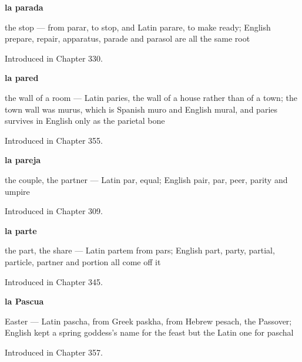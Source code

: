 \noindent\begin{minipage}[t]{\linewidth}
\raggedright
\textbf{la parada}\par
\small the stop — from parar, to stop, and Latin parare, to make ready; English prepare, repair, apparatus, parade and parasol are all the same root\par
\footnotesize Introduced in Chapter 330.
\end{minipage}\par\medskip

\noindent\begin{minipage}[t]{\linewidth}
\raggedright
\textbf{la pared}\par
\small the wall of a room — Latin paries, the wall of a house rather than of a town; the town wall was murus, which is Spanish muro and English mural, and paries survives in English only as the parietal bone\par
\footnotesize Introduced in Chapter 355.
\end{minipage}\par\medskip

\noindent\begin{minipage}[t]{\linewidth}
\raggedright
\textbf{la pareja}\par
\small the couple, the partner --- Latin par, equal; English pair, par, peer, parity and umpire\par
\footnotesize Introduced in Chapter 309.
\end{minipage}\par\medskip

\noindent\begin{minipage}[t]{\linewidth}
\raggedright
\textbf{la parte}\par
\small the part, the share — Latin partem from pars; English part, party, partial, particle, partner and portion all come off it\par
\footnotesize Introduced in Chapter 345.
\end{minipage}\par\medskip

\noindent\begin{minipage}[t]{\linewidth}
\raggedright
\textbf{la Pascua}\par
\small Easter — Latin pascha, from Greek paskha, from Hebrew pesach, the Passover; English kept a spring goddess's name for the feast but the Latin one for paschal\par
\footnotesize Introduced in Chapter 357.
\end{minipage}\par\medskip


